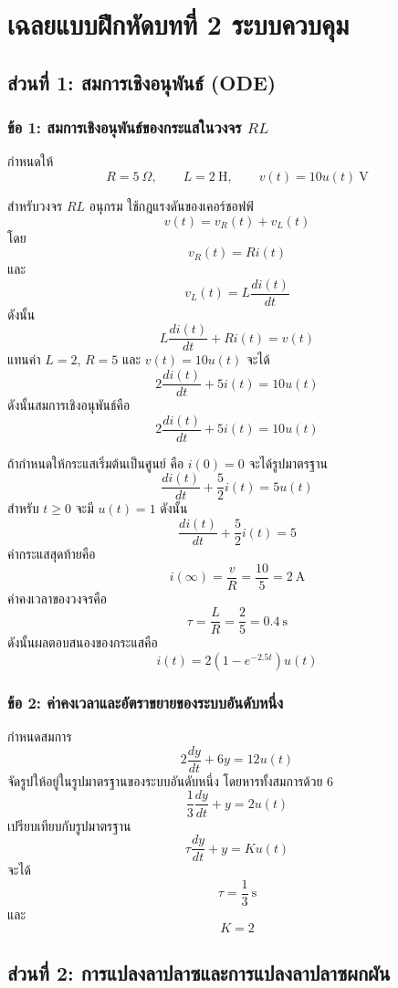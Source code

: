 
\section{เฉลยแบบฝึกหัดบทที่ 2 ระบบควบคุม}

\subsection{ส่วนที่ 1: สมการเชิงอนุพันธ์ (ODE)}

\subsubsection{ข้อ 1: สมการเชิงอนุพันธ์ของกระแสในวงจร $RL$}

กำหนดให้
\[
R=5\ \Omega,\qquad L=2\ \mathrm{H},\qquad v(t)=10u(t)\ \mathrm{V}
\]

สำหรับวงจร $RL$ อนุกรม ใช้กฎแรงดันของเคอร์ชอฟฟ์
\[
v(t)=v_R(t)+v_L(t)
\]
โดย
\[
v_R(t)=Ri(t)
\]
และ
\[
v_L(t)=L\frac{di(t)}{dt}
\]
ดังนั้น
\[
L\frac{di(t)}{dt}+Ri(t)=v(t)
\]
แทนค่า $L=2$, $R=5$ และ $v(t)=10u(t)$ จะได้
\[
2\frac{di(t)}{dt}+5i(t)=10u(t)
\]
ดังนั้นสมการเชิงอนุพันธ์คือ
\[
\boxed{2\frac{di(t)}{dt}+5i(t)=10u(t)}
\]

ถ้ากำหนดให้กระแสเริ่มต้นเป็นศูนย์ คือ $i(0)=0$ จะได้รูปมาตรฐาน
\[
\frac{di(t)}{dt}+\frac{5}{2}i(t)=5u(t)
\]
สำหรับ $t\ge 0$ จะมี $u(t)=1$ ดังนั้น
\[
\frac{di(t)}{dt}+\frac{5}{2}i(t)=5
\]
ค่ากระแสสุดท้ายคือ
\[
i(\infty)=\frac{v}{R}=\frac{10}{5}=2\ \mathrm{A}
\]
ค่าคงเวลาของวงจรคือ
\[
\tau=\frac{L}{R}=\frac{2}{5}=0.4\ \mathrm{s}
\]
ดังนั้นผลตอบสนองของกระแสคือ
\[
\boxed{i(t)=2\left(1-e^{-2.5t}\right)u(t)}
\]

\subsubsection{ข้อ 2: ค่าคงเวลาและอัตราขยายของระบบอันดับหนึ่ง}

กำหนดสมการ
\[
2\frac{dy}{dt}+6y=12u(t)
\]
จัดรูปให้อยู่ในรูปมาตรฐานของระบบอันดับหนึ่ง โดยหารทั้งสมการด้วย $6$
\[
\frac{1}{3}\frac{dy}{dt}+y=2u(t)
\]
เปรียบเทียบกับรูปมาตรฐาน
\[
\tau\frac{dy}{dt}+y=Ku(t)
\]
จะได้
\[
\boxed{\tau=\frac{1}{3}\ \mathrm{s}}
\]
และ
\[
\boxed{K=2}
\]

\subsection{ส่วนที่ 2: การแปลงลาปลาซและการแปลงลาปลาซผกผัน}

